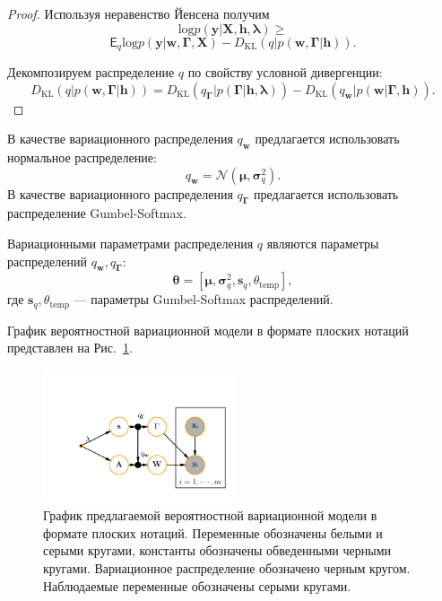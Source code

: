 \begin{proof}
Используя неравенство Йенсена получим 
\[
\text{log} p(\mathbf{y}|\mathbf{X}, \mathbf{h}, \boldsymbol{\lambda}) \geq
\]
\[
   \mathsf{E}_{q} \text{log}p(\mathbf{y}|\mathbf{w}, \boldsymbol{\Gamma}, \mathbf{X}) - D_\text{KL}(q|p(\mathbf{w},\boldsymbol{\Gamma}|\mathbf{h})).
\]

Декомпозируем распределение $q$ по свойству условной дивергенции:
\[
D_\text{KL}(q|p(\mathbf{w},\boldsymbol{\Gamma}|\mathbf{h})) = D_\text{KL}\left(q_{\boldsymbol{\Gamma}}|p(\boldsymbol{\Gamma}|\mathbf{h}, \boldsymbol{\lambda})\right) - D_\text{KL}\left(q_{\mathbf{w}}|p(\mathbf{w}|\boldsymbol{\Gamma}, \mathbf{h})\right).    
\]
\end{proof}

В качестве вариационного распределения $q_{\mathbf{w}}$ предлагается использовать нормальное распределение:
\[
    q_{\mathbf{w}} = \mathcal{N}(\boldsymbol{\mu}, \boldsymbol{\sigma}^2_q).
\]
В качестве вариационного распределения $q_{\boldsymbol{\Gamma}}$ предлагается использовать распределение Gumbel-Softmax.

Вариационными параметрами распределения $q$ являются параметры распределений $q_{\mathbf{w}}, q_{\boldsymbol{\Gamma}}$:
\[
    \boldsymbol{\theta} = [\boldsymbol{\mu}, \boldsymbol{\sigma}^2_q, \mathbf{s}_q, \theta_\text{temp}], 
\]
где $ \mathbf{s}_q, \theta_\text{temp}$ --- параметры Gumbel-Softmax распределений.

График вероятностной вариационной модели в формате плоских нотаций представлен на Рис.~\ref{fig:plate_qprob}.
\begin{figure}
\centering
   \includegraphics[width=0.5\textwidth]{plots/notebooks/plate.pdf}
\caption{График предлагаемой вероятностной вариационной модели в формате плоских нотаций. Переменные обозначены белыми и серыми кругами, константы обозначены обведенными черными кругами. Вариационное распределение обозначено черным кругом. Наблюдаемые переменные обозначены серыми кругами.}
\label{fig:plate_qprob}
\end{figure}


